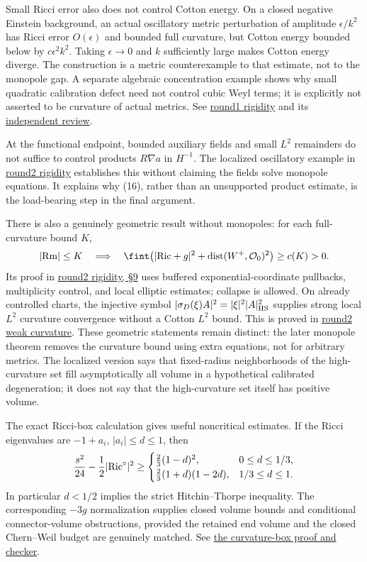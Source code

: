 \documentclass[
  english,
]{article}
\begin{document}
Small Ricci error also does not control Cotton energy. On a closed
negative Einstein background, an actual oscillatory metric perturbation
of amplitude \(\epsilon/k^2\) has Ricci error \(O(\epsilon)\) and
bounded full curvature, but Cotton energy bounded below by
\(c\epsilon^2k^2\). Taking \(\epsilon\to0\) and \(k\) sufficiently large
makes Cotton energy diverge. The construction is a metric counterexample
to that estimate, not to the monopole gap. A separate algebraic
concentration example shows why small quadratic calibration defect need
not control cubic Weyl terms; it is explicitly not asserted to be
curvature of actual metrics. See \href{../proofs/rigidity.md}{round1
rigidity} and its \href{../proofs/rigidity_review.md}{independent
review}.

At the functional endpoint, bounded auxiliary fields and small \(L^2\)
remainders do not suffice to control products \(R\nabla a\) in
\(H^{-1}\). The localized oscillatory example in
\href{../proofs/round2_rigidity.md}{round2 rigidity} establishes this
without claiming the fields solve monopole equations. It explains why
(16), rather than an unsupported product estimate, is the load-bearing
step in the final argument.

There is also a genuinely geometric result without monopoles: for each
full-curvature bound \(K\), \[
 |{\rm Rm}|\le K
 \quad\Longrightarrow\quad
 \fint\bigl(|{\rm Ric}+g|^2+
                 {\rm dist}(W^+,\mathcal O_0)^2\bigr)\ge c(K)>0 .
\] Its proof in \href{../proofs/round2_rigidity.md}{round2 rigidity, §9}
uses buffered exponential-coordinate pullbacks, multiplicity control,
and local elliptic estimates; collapse is allowed. On already controlled
charts, the injective symbol
\(|\sigma_D(\xi)A|^2=|\xi|^2|A|_{\rm HS}^2\) supplies strong local
\(L^2\) curvature convergence without a Cotton \(L^2\) bound. This is
proved in \href{../proofs/round2_weak_curvature.md}{round2 weak
curvature}. These geometric statements remain distinct: the later
monopole theorem removes the curvature bound using extra equations, not
for arbitrary metrics. The localized version says that fixed-radius
neighborhoods of the high-curvature set fill asymptotically all volume
in a hypothetical calibrated degeneration; it does not say that the
high-curvature set itself has positive volume.

The exact Ricci-box calculation gives useful noncritical estimates. If
the Ricci eigenvalues are \(-1+a_i\), \(|a_i|\le d\le1\), then \[
 \frac{s^2}{24}-\frac12|{\rm Ric}^{\circ}|^2
 \ge
 \begin{cases}
  \frac23(1-d)^2,&0\le d\le1/3,\\
  \frac23(1+d)(1-2d),&1/3\le d\le1.
 \end{cases}
\] In particular \(d<1/2\) implies the strict Hitchin--Thorpe
inequality. The corresponding \(-3g\) normalization supplies closed
volume bounds and conditional connector-volume obstructions, provided
the retained end volume and the closed Chern--Weil budget are genuinely
matched. See \href{../proofs/curvature_box.md}{the curvature-box proof
and checker}.
\end{document}
